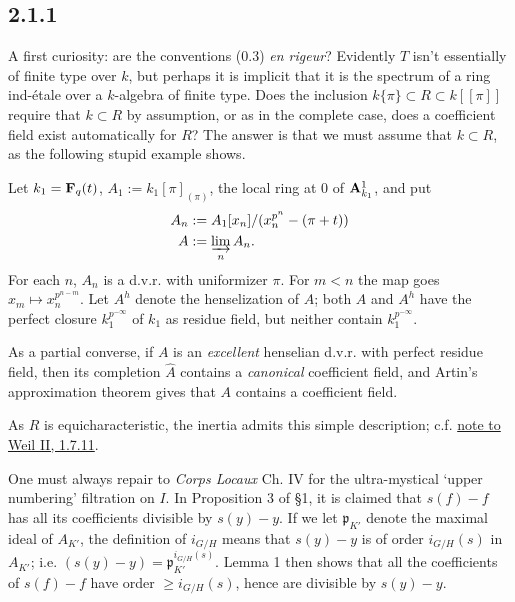 \documentclass[deligne.tex]{subfiles}
\begin{document}
\subsection*{2.1.1}\label{laumon:2.1.1}
A first curiosity: are the conventions (0.3) \emph{en rigeur}?
Evidently $T$ isn't essentially of finite type over $k$, but perhaps it is
implicit that it is the spectrum of a ring ind-étale over a $k$-algebra of
finite type.
Does the inclusion $k\{\pi\}\subset R\subset k[[\pi]]$ require that
$k\subset R$ by assumption, or as in the complete case, does a
coefficient field exist automatically for $R$?
The answer is that we must assume that $k\subset R$, as the following
stupid example shows.

Let $k_1=\mathbf{F}_q(t)$, $A_1:=k_1[\pi]_{(\pi)}$, the local ring at 0 of
$\mathbf{A}^1_{k_1}$, and put
\begin{align*}
	A_n&:=A_1[x_n]/(x_n^{p^n}-(\pi+t)) \\
	A&:=\varinjlim_n A_n.
\end{align*}
For each $n$, $A_n$ is a d.v.r. with uniformizer $\pi$.
For $m<n$ the map goes $x_m\mapsto x_n^{p^{n-m}}$.
Let $A^h$ denote the henselization of $A$; both $A$ and $A^h$
have the perfect closure $k_1^{p^{-\infty}}$ of $k_1$ as residue field, but
neither contain $k_1^{p^{-\infty}}$.

\begin{remark}
As a partial converse, if $A$ is an \emph{excellent} henselian d.v.r.
with perfect residue field, then its completion $\hat A$ contains a
\emph{canonical} coefficient field, and Artin's approximation theorem gives 
that $A$ contains a coefficient field.
\end{remark}

As $R$ is equicharacteristic, the inertia admits this simple description;
c.f. \hyperref[weilii:1.7.11]{note to Weil II, 1.7.11}.

One must always repair to \emph{Corps Locaux} Ch. IV for the ultra-mystical 
`upper numbering' filtration on $I$. In Proposition 3 of \S1, it is claimed
that $s(f)-f$ has all its coefficients divisible by $s(y)-y$.
If we let $\mathfrak p_{K'}$ denote the maximal ideal of $A_{K'}$, the
definition of $i_{G/H}$ means that $s(y)-y$ is of order $i_{G/H}(s)$ in
$A_{K'}$; i.e. $(s(y)-y)=\mathfrak p_{K'}^{i_{G/H}(s)}$.
Lemma 1 then shows that all the coefficients of $s(f)-f$ have order
$\geq i_{G/H}(s)$, hence are divisible by $s(y)-y$.
\end{document}
